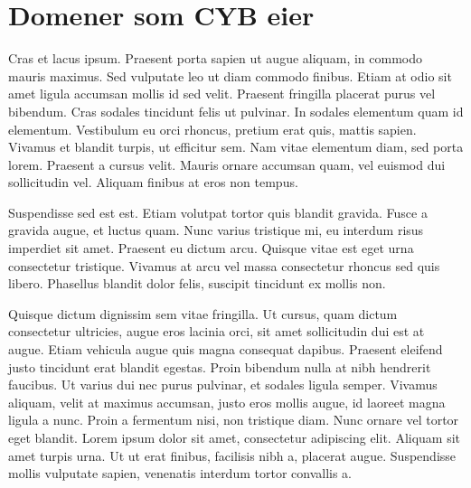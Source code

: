 \documentclass[../../main.tex]{subfiles}
\begin{document}
\chapter{Domener som CYB eier}

Cras et lacus ipsum. Praesent porta sapien ut augue aliquam, in commodo mauris maximus. Sed vulputate leo ut diam commodo finibus. Etiam at odio sit amet ligula accumsan mollis id sed velit. Praesent fringilla placerat purus vel bibendum. Cras sodales tincidunt felis ut pulvinar. In sodales elementum quam id elementum. Vestibulum eu orci rhoncus, pretium erat quis, mattis sapien. Vivamus et blandit turpis, ut efficitur sem. Nam vitae elementum diam, sed porta lorem. Praesent a cursus velit. Mauris ornare accumsan quam, vel euismod dui sollicitudin vel. Aliquam finibus at eros non tempus.

Suspendisse sed est est. Etiam volutpat tortor quis blandit gravida. Fusce a gravida augue, et luctus quam. Nunc varius tristique mi, eu interdum risus imperdiet sit amet. Praesent eu dictum arcu. Quisque vitae est eget urna consectetur tristique. Vivamus at arcu vel massa consectetur rhoncus sed quis libero. Phasellus blandit dolor felis, suscipit tincidunt ex mollis non.

Quisque dictum dignissim sem vitae fringilla. Ut cursus, quam dictum consectetur ultricies, augue eros lacinia orci, sit amet sollicitudin dui est at augue. Etiam vehicula augue quis magna consequat dapibus. Praesent eleifend justo tincidunt erat blandit egestas. Proin bibendum nulla at nibh hendrerit faucibus. Ut varius dui nec purus pulvinar, et sodales ligula semper. Vivamus aliquam, velit at maximus accumsan, justo eros mollis augue, id laoreet magna ligula a nunc. Proin a fermentum nisi, non tristique diam. Nunc ornare vel tortor eget blandit. Lorem ipsum dolor sit amet, consectetur adipiscing elit. Aliquam sit amet turpis urna. Ut ut erat finibus, facilisis nibh a, placerat augue. Suspendisse mollis vulputate sapien, venenatis interdum tortor convallis a.
\end{document}

